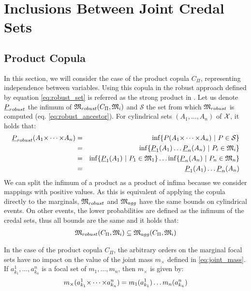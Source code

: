\section{Inclusions Between Joint Credal Sets}\label{sec:inclusions_between_methods}
\subsection{Product Copula}\label{subsection:product_copula}
In this section, we will consider the case of the product copula $C_\Pi$, representing independence between variables. Using this copula in the robust approach defined by equation \eqref{eq:robust_set} is referred as the strong product in \cite{kacprzyk_factorisation_2010}. Let us denote ${\underline{P}}_{robust}$ the infimum of ${\mathfrak{M}}_{robust}(C_\Pi, {\mathfrak{M}}_i)$ and $\mathcal{S}$ the set from which ${\mathfrak{M}}_{robust}$ is computed (eq. \eqref{eq:robust_ancestor}).
For cylindrical sets $(A_1, \dots, A_n)$ of ${\mathcal{X}}$, it holds that:
\begin{eqnarray*}
    {\underline{P}}_{robust}(A_1{\times\dots\times} A_n) &=& \inf\{P(A_1{\times\dots\times} A_n)~|~P\in\mathcal{S}\}\\
    &=&\inf\{{\underline{P}}_1(A_1)\dots{\underline{P}}_n(A_n)~|~P_i\in{\mathfrak{M}}_i\}\\
    &=&\inf\{{\underline{P}}_1(A_1)~|~P_1\in{\mathfrak{M}}_1\}\dots\inf\{{\underline{P}}_n(A_n)~|~P_n\in{\mathfrak{M}}_n\}\\
    &=&{\underline{P}}_1(A_1)\dots{\underline{P}}_n(A_n)
\end{eqnarray*}
We can split the infimum of a product as a product of infima because we consider mappings with positive values. As this is equivalent of applying the copula directly to the marginals, ${\mathfrak{M}}_{robust}$ and ${\mathfrak{M}}_{agg}$ have the same bounds on cylindrical events. On other events, the lower probabilities are defined as the infimum of the credal sets, thus all bounds are the same and it holds that:
\begin{eqnarray}
    {\mathfrak{M}}_{robust}(C_\Pi, {\mathfrak{M}}_i)\subseteq{\mathfrak{M}}_{agg}(C_\Pi, {\mathfrak{M}}_i)
\end{eqnarray}

In the case of the product copula $C_\Pi$, the arbitrary orders on the marginal focal sets have no impact on the value of the joint mass $m_\times$ defined in \eqref{eq:joint_mass}. If $a^1_{k_1},\dots,a^n_{k_n}$ is a focal set of $m_1,\dots,m_n$, then $m_\times$ is given by:
\begin{eqnarray}\label{eq:joint_mass_product}
    m_\times(a^1_{k_1}{\times\dots\times} a^n_{k_n}) = m_1(a^1_{k_1})\dots m_n(a^n_{k_n})
\end{eqnarray}

